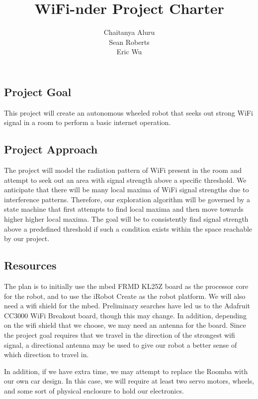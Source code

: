 \documentclass[letterpaper]{article}
\begin{document}
\title{WiFi-nder Project Charter}
\author{Chaitanya Aluru \\ Sean Roberts \\ Eric Wu}
\date{}
\maketitle

\subsection*{Project Goal}

This project will create an autonomous wheeled robot that seeks out strong WiFi signal in a room to perform a basic internet operation.

\subsection*{Project Approach}

The project will model the radiation pattern of WiFi present in the room and attempt to seek out an area with signal strength above a specific threshold. We anticipate that there will be many local maxima of WiFi signal strengths due to interference patterns. Therefore, our exploration algorithm will be governed by a state machine that first attempts to find local maxima and then move towards higher higher local maxima. The goal will be to consistently find signal strength above a predefined threshold if such a condition exists within the space reachable by our project.

\subsection*{Resources}

The plan is to initially use the mbed FRMD KL25Z board as the processor core for the robot, and to use the iRobot Create as the robot platform. We will also need a wifi shield for the mbed. Preliminary searches have led us to the Adafruit CC3000 WiFi Breakout board, though this may change. In addition, depending on the wifi shield that we choose, we may need an antenna for the board. Since the project goal requires that we travel in the direction of the strongest wifi signal, a directional antenna may be used to give our robot a better sense of which direction to travel in.

In addition, if we have extra time, we may attempt to replace the Roomba with our own car design. In this case, we will require at least two servo motors, wheels, and some sort of physical enclosure to hold our electronics.
\end{document}
